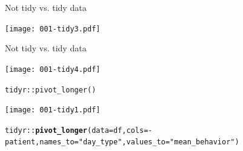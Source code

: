\documentclass[10pt]{beamer}\usepackage[]{graphicx}\usepackage[]{color}
\makeatletter
\newcommand{\hlstr}[1]{\textcolor[rgb]{0.192,0.494,0.8}{#1}}%
\newcommand{\hlopt}[1]{\textcolor[rgb]{0,0,0}{#1}}%
\newcommand{\hlstd}[1]{\textcolor[rgb]{0.345,0.345,0.345}{#1}}%
\newcommand{\hlkwc}[1]{\textcolor[rgb]{0.333,0.667,0.333}{#1}}%
\newcommand{\hlkwd}[1]{\textcolor[rgb]{0.737,0.353,0.396}{\textbf{#1}}}%
\newenvironment{kframe}{%
 \def\at@end@of@kframe{}%
 \ifinner\ifhmode%
  \def\at@end@of@kframe{\end{minipage}}%
  \begin{minipage}{\columnwidth}%
 \fi\fi%
 \def\FrameCommand##1{\hskip\@totalleftmargin \hskip-\fboxsep
 \colorbox{shadecolor}{##1}\hskip-\fboxsep
     \hskip-\linewidth \hskip-\@totalleftmargin \hskip\columnwidth}%
 \MakeFramed {\advance\hsize-\width
   \@totalleftmargin\z@ \linewidth\hsize
   \@setminipage}}%
 {\par\unskip\endMakeFramed%
 \at@end@of@kframe}
\newenvironment{knitrout}{}{} %
\makeatother
\begin{document}
\begin{frame}[fragile]{Not tidy vs. tidy data}
	
	
	
	\texttt{[image: 001-tidy3.pdf]}
	
	
	
\end{frame}

\begin{frame}[fragile]{Not tidy vs. tidy data}
	
	
	
	\texttt{[image: 001-tidy4.pdf]}
	
	
	
\end{frame}


\begin{frame}[fragile]{\texttt{tidyr::pivot\_longer()}}
	
	
	
	\texttt{[image: 001-tidy1.pdf]}
	
	
\begin{knitrout}\tiny
{}\color{fgcolor}\begin{kframe}
\begin{alltt}
\hlstd{tidyr}\hlopt{::}\hlkwd{pivot_longer}\hlstd{(}\hlkwc{data} \hlstd{= df,} \hlkwc{cols} \hlstd{=} \hlopt{-}\hlstd{patient,} \hlkwc{names_to} \hlstd{=} \hlstr{"day_type"}\hlstd{,} \hlkwc{values_to} \hlstd{=} \hlstr{"mean_behavior"}\hlstd{)}
\end{alltt}
\end{kframe}
\end{knitrout}
	
	
\end{frame}
\end{document}
